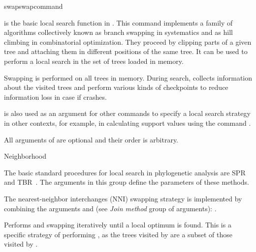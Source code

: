 \begin{command}{swap}{swapcommand}


	\begin{poydescription} 
             is the basic local search function in \poy. This
            command implements a family of algorithms collectively known as
            branch swapping in systematics and as hill climbing in combinatorial
            optimization. They proceed by clipping parts of a given tree and
            attaching them in different positions of the same tree.  It can be
            used to perform a local search in the set of trees loaded in memory.

            Swapping is performed on all trees in memory. During search,
             collects information about the
            visited trees and perform various kinds of checkpoints to reduce
            information loss in case if \poy crashes.

             is also used as an argument for other
            commands to specify a local search strategy in other contexts, for example,
            in calculating support values using the command
            .
            
            All arguments of  are optional and their order
            is arbitrary.
            
        \end{poydescription}

	\begin{arguments}

	\begin{argumentgroup}{Neighborhood}
	{The basic standard procedures for local search in phylogenetic
            analysis are SPR and TBR~\cite{swofford1990}. The arguments in this group define the
            parameters of these methods.
            
            The nearest-neighbor interchanges (NNI) swapping strategy is implemented by combining 
            the arguments  and  (see \emph{Join method} group of
            arguments): .
            }
            \label{swap_neigh}

	     {Performs  and 
                swapping iteratively until a local optimum is found.
                This is a specific strategy of performing ,
                as the trees visited by  are a subset
                of those visited by .}
                {}


\end{argumentgroup}
\end{arguments}
\end{command}
